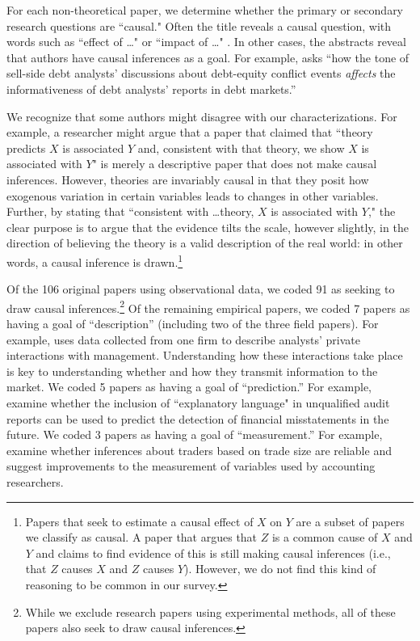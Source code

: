 \documentclass[12pt,reqno,titlepage]{amsart}
\theoremstyle{definition}
\begin{document}
\begin{doublespace}
For each non-theoretical paper, we determine whether the primary or secondary research questions are ``causal." 
Often the title reveals a causal question, with words such as ``effect of \dots" or ``impact of \dots" \citep[e.g.][]{Cohen:2014jl,Clorproell:2014cv}. 
In other cases, the abstracts reveal that authors have causal inferences as a goal. 
For example, \citet{deFranco:2014ct} asks ``how the tone of sell-side debt analysts' discussions about debt-equity conflict events \emph{affects} the informativeness of debt analysts' reports in debt markets.''

We recognize that some authors might disagree with our characterizations.
For example, a researcher might argue that a paper that claimed that ``theory predicts $X$ is associated $Y$ and, consistent with that theory, we show $X$ is associated with $Y$" is merely a descriptive paper that does not make causal inferences.
However, theories are invariably causal in that they posit how exogenous variation in certain variables leads to changes in other variables.
Further, by stating that ``consistent with \dots theory, $X$ is associated with $Y$," the clear purpose is to argue that the evidence tilts the scale, however slightly, in the direction of believing the theory is a valid description of the real world: in other words, a causal inference is drawn.\footnote{
Papers that seek to estimate a causal effect of $X$ on $Y$ are a subset of papers we classify as causal.
A paper that argues that $Z$ is a common cause of $X$ and $Y$ and claims to find evidence of this is still making causal inferences (i.e., that $Z$ causes $X$ and $Z$ causes $Y$).
However, we do not find this kind of reasoning to be common in our survey.}

Of the 106 original papers using observational data, we coded 91 as seeking to draw causal inferences.\footnote{While we exclude research papers using experimental methods, all of these papers also seek to draw causal inferences.}
Of the remaining empirical papers, we coded 7 papers as having a goal of ``description'' (including two of the three field papers). 
For example, \citet{Soltes:2013ba} uses data collected from one firm to describe analysts' private interactions with management. Understanding how these interactions take place is key to understanding whether and how they transmit information to the market.
We coded 5 papers as having a goal of ``prediction.'' 
For example, \citet{Czerney:2014bv} examine whether the inclusion of ``explanatory language" in unqualified audit reports can be used to predict the detection of financial misstatements in the future.
We coded 3 papers as having a goal of ``measurement.'' 
For example, \citet{Cready:2014ji} examine whether inferences about traders based on trade size are reliable and suggest improvements to the measurement of variables used by accounting researchers.


\end{doublespace}
\end{document}
